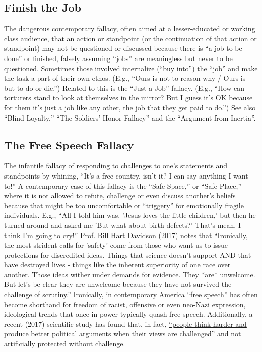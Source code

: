 \documentclass[10pt,a4paper,british]{article}
\begin{document}
\begin{multicols}{2}
    \subsection{Finish the Job}  The dangerous contemporary fallacy, often aimed
    at a lesser{-}educated or working class audience, that an action or
    standpoint (or the continuation of that action or standpoint) may not be
    questioned or discussed because there is ``a job to be done'' or finished,
    falsely assuming ``jobs'' are meaningless but never to be questioned.
    Sometimes those involved internalize (``buy into'') the ``job'' and make the
    task a part of their own ethos.  (E.g., ``Ours is not to reason why / Ours
    is but to do or die.'') Related to this is the ``Just a Job'' fallacy.
    (E.g., ``How can torturers stand to look at themselves in the mirror? But I
    guess it's OK because for them it's just a job like any other, the job that
    they get paid to do.'')   See also ``Blind Loyalty,'' ``The Soldiers' Honor
    Fallacy'' and the ``Argument from Inertia''.

	\subsection{The Free Speech Fallacy} The infantile fallacy of responding to
	challenges to one's statements and standpoints by whining, ``It's a free
	country, isn't it?  I can say anything I want to!'' A contemporary case of
	this fallacy is the ``Safe Space,'' or ``Safe Place,'' where it is not
	allowed to refute, challenge or even discuss another's beliefs because that
	might be too uncomfortable or ``triggery'' for emotionally fragile
	individuals. E.g., ``All I told him was, 'Jesus loves the little children,'
	but then he turned around and asked me 'But what about birth defects?'
	That's mean. I think I'm going to cry!''  \href{http://billhd.com/}{Prof.
	Bill Hart Davidson} (2017) notes that ``Ironically, the most strident calls
	for 'safety' come from those who want us to issue protections for
	discredited ideas. Things that science doesn't support AND that have
	destroyed lives {-} things like the inherent superiority of one race over
	another. Those ideas wither under demands for evidence. They *are*
	unwelcome. But let's be clear they are unwelcome because they have not
	survived the challenge of scrutiny.'' Ironically, in contemporary America
	``free speech'' has often become shorthand for freedom of racist, offensive
	or even neo{-}Nazi expression, ideological trends that once in power
	typically quash free speech.  Additionally, a recent (2017) scientific
	study has found that, in fact,
	\href{https://www.eurekalert.org/pub_releases/2017-09/bu-pth092717.php}{``people
	think harder and produce better political arguments when their views are
	challenged''} and not artificially protected without challenge.


\end{multicols}
\end{document}
